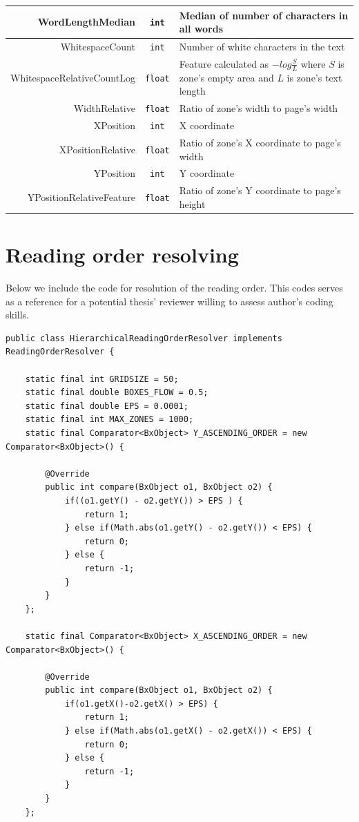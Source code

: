 \begin{appendix}
\begin{longtable}[c]{|r|c|p{8cm}|}
WordLengthMedian & \verb+int+ & Median of number of characters in all words \\ \hline
WhitespaceCount & \verb+int+ & Number of white characters in the text\\ \hline
WhitespaceRelativeCountLog & \verb+float+ & Feature calculated as $-log \frac{S}{L}$ where $S$ is zone's empty area and $L$ is zone's text length \\ \hline
WidthRelative & \verb+float+ & Ratio of zone's width to page's width\\ \hline
XPosition & \verb+int+ & X coordinate\\ \hline
XPositionRelative & \verb+float+ & Ratio of zone's X coordinate to page's width \\ \hline
YPosition & \verb+int+ & Y coordinate \\ \hline
YPositionRelativeFeature & \verb+float+ & Ratio of zone's Y coordinate to page's height \\ \hline
\end{longtable}

\chapter{Reading order resolving} \label{appendix:ror}
Below we include the code for resolution of the reading order. This codes serves as a reference for a potential thesis' reviewer willing to assess author's coding skills.
\vspace{1cm}
\begin{lstlisting}
public class HierarchicalReadingOrderResolver implements ReadingOrderResolver {

    static final int GRIDSIZE = 50;
    static final double BOXES_FLOW = 0.5;
    static final double EPS = 0.0001;
    static final int MAX_ZONES = 1000;
    static final Comparator<BxObject> Y_ASCENDING_ORDER = new Comparator<BxObject>() {

        @Override
        public int compare(BxObject o1, BxObject o2) {
        	if((o1.getY() - o2.getY()) > EPS ) {
        		return 1;
        	} else if(Math.abs(o1.getY() - o2.getY()) < EPS) {
        		return 0;
        	} else {
        		return -1;
        	}
        }
    };

    static final Comparator<BxObject> X_ASCENDING_ORDER = new Comparator<BxObject>() {

        @Override
        public int compare(BxObject o1, BxObject o2) {
        	if(o1.getX()-o2.getX() > EPS) {
        		return 1;
        	} else if(Math.abs(o1.getX() - o2.getX()) < EPS) {
        		return 0;
        	} else {
        		return -1;
        	}
        }
    };
    

\end{lstlisting}
\end{appendix}

